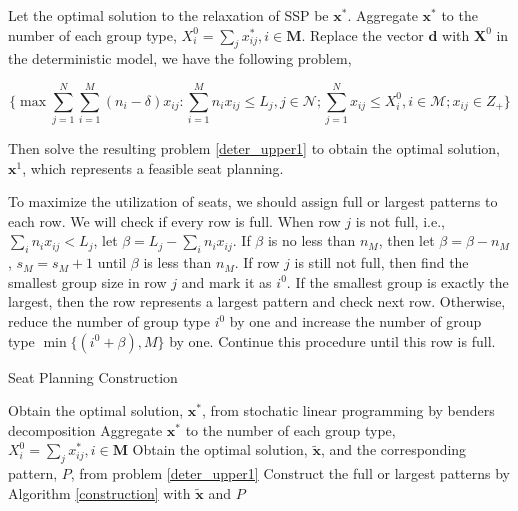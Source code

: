 
Let the optimal solution to the relaxation of SSP be $\mathbf{x}^{*}$. Aggregate $\mathbf{x}^{*}$ to the number of each group type, ${X}_{i}^{0} =\sum_{j} x^{*}_{ij}, i \in \mathbf{M}$. Replace the vector $\mathbf{d}$ with $\mathbf{X}^{0}$ in the deterministic model, we have the following problem, 

\begin{equation}\label{deter_upper1}
  \{\max \sum_{j=1}^{N} \sum_{i=1}^{M}(n_i -\delta) x_{ij}: \sum_{i = 1}^{M} n_i x_{ij} \leq L_{j}, j \in \mathcal{N}; \sum_{j =1}^{N} x_{ij} \leq X_{i}^{0}, i \in \mathcal{M}; x_{ij} \in Z_{+} \}
\end{equation}

Then solve the resulting problem \eqref{deter_upper1} to obtain the optimal solution, $\mathbf{x}^{1}$, which represents a feasible seat planning.

To maximize the utilization of seats, we should assign full or largest patterns to each row. We will check if every row is full. When row $j$ is not full, i.e., $\sum_{i} n_{i} x_{ij} < L_{j}$, let $\beta = L_{j} - \sum_{i} n_{i} x_{ij}$. If $\beta$ is no less than $n_M$, then let $\beta = \beta - n_M$, $s_M = s_M +1$ until $\beta$ is less than $n_M$. If row $j$ is still not full, then find the smallest group size in row $j$ and mark it as $i^0$. If the smallest group is exactly the largest, then the row represents a largest pattern and check next row. Otherwise, reduce the number of group type $i^0$ by one and increase the number of group type $\min \{(i^0+\beta), M\}$ by one. Continue this procedure until this row is full.


\begin{algorithm}
  \caption{Seat Planning Construction}\label{seat_construction}
    {Obtain the optimal solution, $\mathbf{x}^{*}$, from stochatic linear programming by benders decomposition\;}
    {Aggregate $\mathbf{x}^{*}$ to the number of each group type, ${X}_{i}^{0} = \sum_{j} x^{*}_{ij}, i \in \mathbf{M}$\;}
    {Obtain the optimal solution, $\tilde{\mathbf{x}}$, and the corresponding pattern, $P$, from problem \eqref{deter_upper1}\;}
    {Construct the full or largest patterns by Algorithm \ref{construction} with $\tilde{\mathbf{x}}$ and $P$\;}
\end{algorithm}

